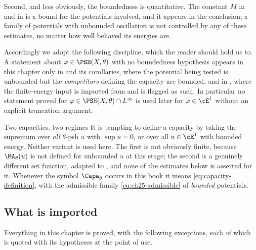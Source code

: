 Second, and less obviously, the boundedness is quantitative.  The constant
\(M\) in  and in
 is a bound for the potentials
involved, and it appears in the conclusion; a family of potentials with
unbounded oscillation is not controlled by any of these estimates, no matter
how well behaved its energies are.

Accordingly we adopt the following discipline, which the reader should hold
us to.  A statement about \(\varphi\in\PSH(X,\theta)\) with no boundedness
hypothesis appears in this chapter only in
 and its corollaries, where the potential
being tested is unbounded but the \emph{competitors} defining the capacity
are bounded, and in , where the finite-energy input is
imported from  and is flagged as such.  In particular
no statement proved for \(\varphi\in\PSH(X,\theta)\cap L^\infty\) is used
later for \(\varphi\in\cE^1\) without an explicit truncation argument.

\begin{warning}{Two capacities, two regimes}
It is tempting to define a capacity by taking the supremum over
\emph{all} \(\theta\)-psh \(u\) with \(\sup u=0\), or over all
\(u\in\cE^1\) with bounded energy.  Neither variant is used here.  The first
is not obviously finite, because \(\MA_\theta(u)\) is not defined for
unbounded \(u\) at this stage; the second is a genuinely different set
function, adapted to , and none of the
estimates below is asserted for it.  Whenever the symbol \(\Capa_\theta\)
occurs in this book it means \eqref{eq:capacity-definition}, with the
admissible family \eqref{eq:ch25-admissible} of \emph{bounded} potentials.
\end{warning}

\subsection{What is imported}
\label{sec:ch25-imported}

Everything in this chapter is proved, with the following exceptions, each of
which is quoted with its hypotheses at the point of use.

